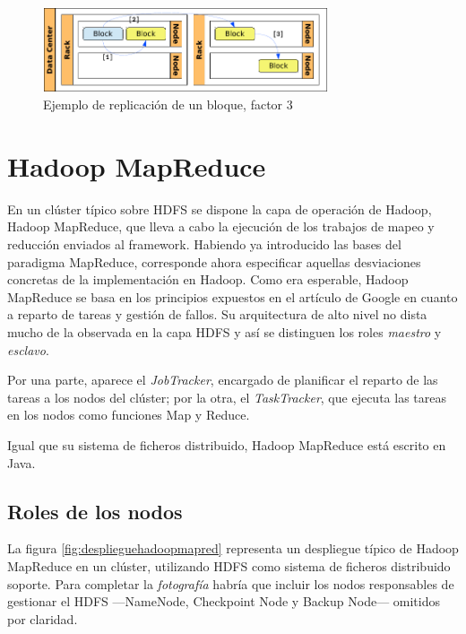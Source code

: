 \begin{figure}[tbp]
\begin{center}
\includegraphics[width=0.75\textwidth]{imagenes/019.pdf}
 \caption{Ejemplo de replicaci\'on de un bloque, factor 3}
\label{fig:repbloque}
\end{center}
\end{figure}


\section{Hadoop MapReduce}\label{sec:hadoopmapred}
\noindent En un cl\'uster t\'ipico sobre HDFS se dispone la capa de operaci\'on de Hadoop, Hadoop MapReduce, que lleva a cabo la ejecuci\'on de los trabajos de mapeo y reducci\'on enviados al framework. Habiendo ya introducido las bases del paradigma MapReduce, corresponde ahora especificar aquellas desviaciones concretas de la implementaci\'on en Hadoop. Como era esperable, Hadoop MapReduce se basa en los principios expuestos en el art\'iculo de Google \cite{googlemapreduce} en cuanto a reparto de tareas y gesti\'on de fallos. Su arquitectura de alto nivel no dista mucho de la observada en la capa HDFS y as\'i se distinguen los roles \emph{maestro} y \emph{esclavo}.\newline

Por una parte, aparece el \emph{JobTracker}, encargado de planificar el reparto de las tareas a los nodos del cl\'uster; por la otra, el \emph{TaskTracker}, que ejecuta las tareas en los nodos como funciones Map y Reduce.\newline

Igual que su sistema de ficheros distribuido, Hadoop MapReduce est\'a escrito en Java.


\subsection{Roles de los nodos}\label{subsec:rolesnodosmapred}
\noindent La figura \ref{fig:desplieguehadoopmapred} representa un despliegue t\'ipico de Hadoop MapReduce en un cl\'uster, utilizando HDFS como sistema de ficheros distribuido soporte. Para completar la \emph{fotograf\'ia} habr\'ia que incluir los nodos responsables de gestionar el HDFS ---NameNode, Checkpoint Node y Backup Node--- omitidos por claridad.

